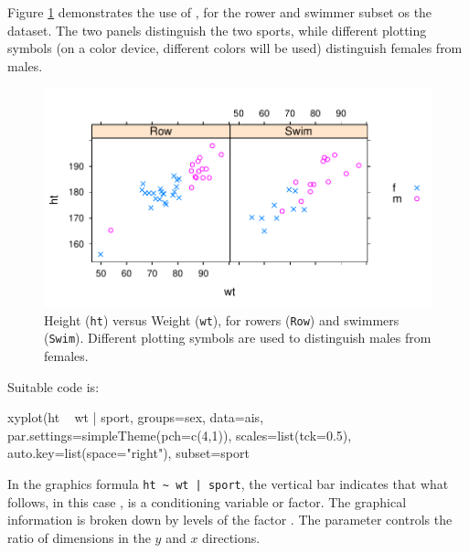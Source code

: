 Figure \ref{fig:lattice-ais} demonstrates the use of ,
for the rower and swimmer subset os the  dataset.  The two
panels distinguish the two sports, while different plotting symbols
(on a color device, different colors will be used) distinguish females
from males.
\begin{figure}[h]
\begin{Schunk}


\centerline{\includegraphics[width=\textwidth]{figs/09-rowSwim-1} }

\end{Schunk}
      \caption{Height (\texttt{ht}) versus Weight (\texttt{wt}), for
        rowers (\texttt{Row}) and swimmers (\texttt{Swim}).
        Different plotting symbols are used to distinguish males from
        females.}\label{fig:lattice-ais}
\end{figure}

\noindent
Suitable code is:
\begin{Schunk}
\begin{Sinput}
xyplot(ht ~ wt | sport, groups=sex, data=ais,
       par.settings=simpleTheme(pch=c(4,1)),
       scales=list(tck=0.5),
       auto.key=list(space="right"),
       subset=sport%
\end{Sinput}
\end{Schunk}

In the graphics formula \verb!ht ~ wt | sport!, the vertical bar
indicates that what follows, in this case , is a
conditioning variable or factor.  The graphical information is broken
down by levels of the factor .  The parameter
 controls the ratio of dimensions in the $y$ and $x$
directions.

